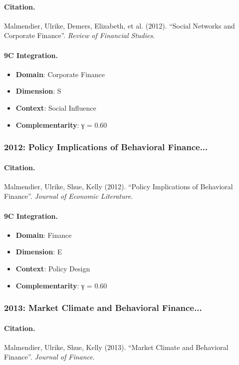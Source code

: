 \paragraph{Citation.}
Malmendier, Ulrike, Demers, Elizabeth, et al. (2012). ``Social Networks and Corporate Finance''. \textit{Review of Financial Studies}.

\paragraph{9C Integration.}
\begin{itemize}[nosep]
  \item \textbf{Domain}: Corporate Finance
  \item \textbf{Dimension}: S
  \item \textbf{Context}: Social Influence
  \item \textbf{Complementarity}: γ = 0.60
\end{itemize}


\subsubsection{2012: Policy Implications of Behavioral Finance...}

\paragraph{Citation.}
Malmendier, Ulrike, Shue, Kelly (2012). ``Policy Implications of Behavioral Finance''. \textit{Journal of Economic Literature}.

\paragraph{9C Integration.}
\begin{itemize}[nosep]
  \item \textbf{Domain}: Finance
  \item \textbf{Dimension}: E
  \item \textbf{Context}: Policy Design
  \item \textbf{Complementarity}: γ = 0.60
\end{itemize}


\subsubsection{2013: Market Climate and Behavioral Finance...}

\paragraph{Citation.}
Malmendier, Ulrike, Shue, Kelly (2013). ``Market Climate and Behavioral Finance''. \textit{Journal of Finance}.

